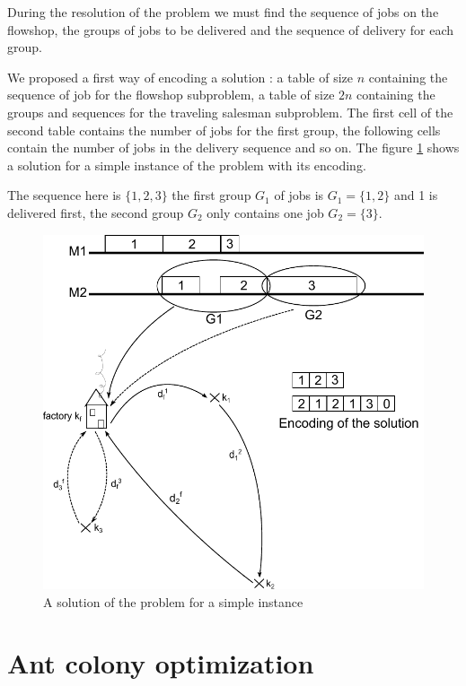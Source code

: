 \documentclass[UTF8, twoside]{EPURapport}
\begin{document}
	During the resolution of the problem we must find the sequence of jobs on the flowshop, the groups of jobs to be delivered and the sequence of delivery for each group.

	We proposed a first way of encoding a solution : a table of size $n$ containing the sequence of job for the flowshop subproblem, a table of size $2n$ containing the groups and sequences for the traveling salesman subproblem. The first cell of the second table contains the number of jobs for the first group, the following cells contain the number of jobs in the delivery sequence and so on. The figure \ref{problem} shows a solution for a simple instance of the problem with its encoding. 
	
	The sequence here is $\{1,2,3\}$ the first group $G_1$ of jobs is $G_1 = \{1,2\}$ and 1 is delivered first, the second group $G_2$ only contains one job $G_2 = \{3\}$.
	
	
\begin{figure}
	\centering \includegraphics{images/problem.pdf}
	\caption {A solution of the problem for a simple instance}	
	\label {problem}
\end{figure}

\chapter{Ant colony optimization}
\end{document}
